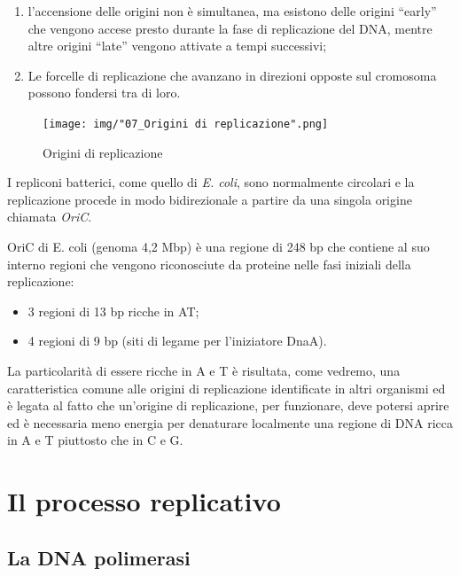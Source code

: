 \documentclass[11pt]{book}
\begin{document}
\begin{enumerate}
\def\labelenumi{\arabic{enumi}.}
\itemsep1pt\parskip0pt
\item
  l'accensione delle origini non è simultanea, ma esistono delle origini
  ``early'' che vengono accese presto durante la fase di replicazione
  del DNA, mentre altre origini ``late'' vengono attivate a tempi
  successivi;
\item
  Le forcelle di replicazione che avanzano in direzioni opposte sul
  cromosoma possono fondersi tra di loro.
\end{enumerate}

\begin{figure}[htp]
\centering
\texttt{[image: img/"07\_Origini di replicazione".png]}
\caption{Origini di replicazione}
\label{origini-di-replicazione}
\end{figure}

I repliconi batterici, come quello di \emph{E. coli}, sono normalmente
circolari e la replicazione procede in modo bidirezionale a partire da
una singola origine chiamata \emph{OriC}.

OriC di E. coli (genoma 4,2 Mbp) è una regione di 248 bp che contiene al
suo interno regioni che vengono riconosciute da proteine nelle fasi
iniziali della replicazione:

\begin{itemize}
\itemsep1pt\parskip0pt
\item
  3 regioni di 13 bp ricche in AT;
\item
  4 regioni di 9 bp (siti di legame per l'iniziatore DnaA).
\end{itemize}

La particolarità di essere ricche in A e T è risultata, come vedremo,
una caratteristica comune alle origini di replicazione identificate in
altri organismi ed è legata al fatto che un'origine di replicazione, per
funzionare, deve potersi aprire ed è necessaria meno energia per
denaturare localmente una regione di DNA ricca in A e T piuttosto che in
C e G.

\section{Il processo replicativo}\label{il-processo-replicativo}

\subsection{La DNA polimerasi}\label{la-dna-polimerasi}
\end{document}
